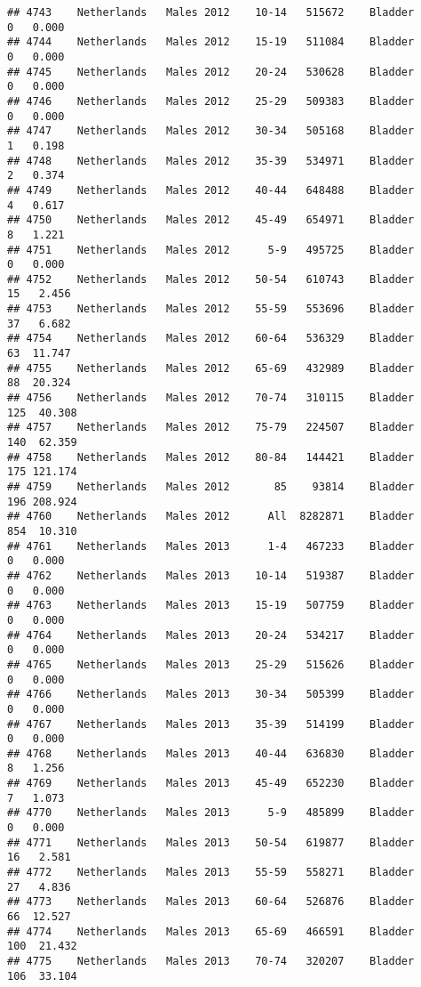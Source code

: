\documentclass[
]{article}
\begin{document}
\begin{verbatim}
## 4743    Netherlands   Males 2012    10-14   515672    Bladder      0   0.000
## 4744    Netherlands   Males 2012    15-19   511084    Bladder      0   0.000
## 4745    Netherlands   Males 2012    20-24   530628    Bladder      0   0.000
## 4746    Netherlands   Males 2012    25-29   509383    Bladder      0   0.000
## 4747    Netherlands   Males 2012    30-34   505168    Bladder      1   0.198
## 4748    Netherlands   Males 2012    35-39   534971    Bladder      2   0.374
## 4749    Netherlands   Males 2012    40-44   648488    Bladder      4   0.617
## 4750    Netherlands   Males 2012    45-49   654971    Bladder      8   1.221
## 4751    Netherlands   Males 2012      5-9   495725    Bladder      0   0.000
## 4752    Netherlands   Males 2012    50-54   610743    Bladder     15   2.456
## 4753    Netherlands   Males 2012    55-59   553696    Bladder     37   6.682
## 4754    Netherlands   Males 2012    60-64   536329    Bladder     63  11.747
## 4755    Netherlands   Males 2012    65-69   432989    Bladder     88  20.324
## 4756    Netherlands   Males 2012    70-74   310115    Bladder    125  40.308
## 4757    Netherlands   Males 2012    75-79   224507    Bladder    140  62.359
## 4758    Netherlands   Males 2012    80-84   144421    Bladder    175 121.174
## 4759    Netherlands   Males 2012       85    93814    Bladder    196 208.924
## 4760    Netherlands   Males 2012      All  8282871    Bladder    854  10.310
## 4761    Netherlands   Males 2013      1-4   467233    Bladder      0   0.000
## 4762    Netherlands   Males 2013    10-14   519387    Bladder      0   0.000
## 4763    Netherlands   Males 2013    15-19   507759    Bladder      0   0.000
## 4764    Netherlands   Males 2013    20-24   534217    Bladder      0   0.000
## 4765    Netherlands   Males 2013    25-29   515626    Bladder      0   0.000
## 4766    Netherlands   Males 2013    30-34   505399    Bladder      0   0.000
## 4767    Netherlands   Males 2013    35-39   514199    Bladder      0   0.000
## 4768    Netherlands   Males 2013    40-44   636830    Bladder      8   1.256
## 4769    Netherlands   Males 2013    45-49   652230    Bladder      7   1.073
## 4770    Netherlands   Males 2013      5-9   485899    Bladder      0   0.000
## 4771    Netherlands   Males 2013    50-54   619877    Bladder     16   2.581
## 4772    Netherlands   Males 2013    55-59   558271    Bladder     27   4.836
## 4773    Netherlands   Males 2013    60-64   526876    Bladder     66  12.527
## 4774    Netherlands   Males 2013    65-69   466591    Bladder    100  21.432
## 4775    Netherlands   Males 2013    70-74   320207    Bladder    106  33.104

\end{verbatim}
\end{document}
